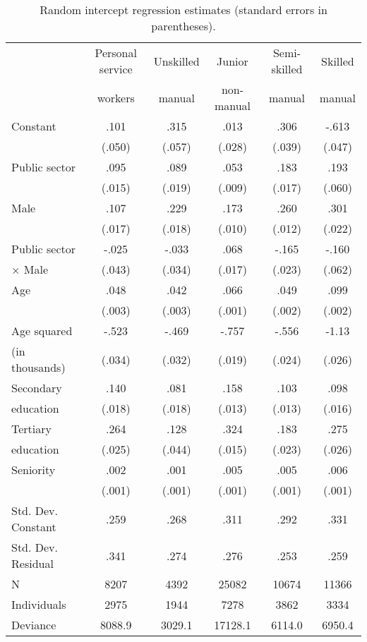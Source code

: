\documentclass[a4paper,11pt,titlepage]{article}
\begin{document}
\begin{table}[tb]
    \caption{Random intercept regression estimates (standard errors in parentheses).\label{tab:full}}
    \begin{tabularx}{\textwidth}{Yccccc}
    \toprule
    &Personal service&Unskilled&Junior &Semi-skilled&Skilled \\
    & workers        &manual   &non-manual & manual &manual \\
    \midrule
    Constant			&	.101 	&.315		&	.013	&	.306	&	-.613\\
    							&(.050)	&(.057)	&(.028)	&(.039)	&(.047)\\
    Public sector	&.095		&.089		&	.053	&	.183	&	.193\\
    							&(.015)	&(.019)	&(.009)	&(.017)	&(.060)\\
    Male					&	.107	&	.229	&	.173	&	.260	&	.301\\
    							&(.017)	&(.018)	&(.010)	&(.012)	&(.022)\\
    Public sector &-.025	&	-.033	&	.068	&-.165	&	-.160\\
    \quad $\times	$ Male%
    							&(.043)	&(.034)	&(.017)	&(.023)&(.062)\\
    Age						&	.048	&	.042	&	.066	&	.049	&	.099\\
    							&(.003)	&(.003)	&(.001)	&(.002)	&(.002)\\
    Age squared		&-.523	&	-.469	&	-.757	&-.556	&	-1.13\\
    \quad (in thousands)%
    							&(.034)	&(.032)	&(.019)	&(.024)&(.026)\\
    Secondary 		&	.140	&	.081	&	.158	&	.103	&	.098\\
    \quad education&(.018)&(.018)	&(.013)	&(.013)	&(.016)\\
    Tertiary			&	.264	&.128		&	.324	&	.183	&	.275\\
    \quad education&(.025)&(.044)	&(.015)	&(.023)	&(.026)\\
    Seniority			&	.002	&.001		&	.005	&	.005	&	.006\\
    							&(.001)	&(.001)	&(.001)	&(.001)	&(.001)\\
    \midrule
    Std. Dev. Constant&	.259&	.268&	.311	&	.292	&	.331\\
    Std. Dev. Residual&	.341&	.274&	.276	&	.253	&	.259\\
    N								  &8207 &	4392&	25082	&10674	&	11366\\
    Individuals				&	2975&	1944&	7278	&	3862	&	3334\\
    Deviance			&	8088.9&	3029.1&	17128.1&6114.0&6950.4\\
    \bottomrule
    \end{tabularx}
\end{table}
\end{document}
